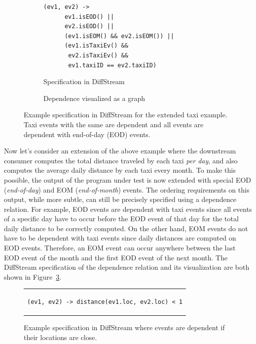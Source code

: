 \begin{figure}[t]
  \centering \footnotesize{}
  \begin{subfigure}[b]{0.56\textwidth}
    \centering
    \begin{lstlisting}[basicstyle=\ttfamily\small,linewidth=7.3cm]
  (ev1, ev2) ->
      ev1.isEOD() ||
      ev2.isEOD() ||
      (ev1.isEOM() && ev2.isEOM()) ||
      (ev1.isTaxiEv() &&
       ev2.isTaxiEv() &&
       ev1.taxiID == ev2.taxiID)
    \end{lstlisting}
    \caption{Specification in DiffStream}
    \label{diffstream:fig:extended-taxi-example-dependency-spec}
  \end{subfigure}%
  \qquad
  \begin{subfigure}[b]{0.36\textwidth}
    \centering
    \caption{Dependence visualized as a graph}
    \label{diffstream:fig:extended-taxi-example-dependency-vis}
  \end{subfigure}
  \caption{Example specification in DiffStream for the extended taxi example. Taxi events with the same  are dependent
      and all events are dependent with end-of-day (EOD) events.}
  \label{diffstream:fig:extended-example-dependencies}
\end{figure}

Now let's consider an extension of the above example where the downstream consumer
computes the total distance traveled by each taxi \emph{per
  day}, and also computes the average daily distance by each taxi
every month. To make this possible, the output of the program under test
is now
extended with special EOD (\emph{end-of-day}) and EOM (\emph{end-of-month})
events. The ordering requirements on this output, while more subtle, can still be
precisely specified using a dependence relation.
For example, EOD events are dependent with taxi events since all events of a specific day have to occur before the EOD event of that day for the total daily distance to be correctly computed. On the other hand, EOM events do not have to be dependent with taxi events since daily distances are computed on EOD events. Therefore, an EOM event can occur anywhere between the last EOD event of the month and the first EOD event of the next month.
The DiffStream specification of the dependence relation and its visualization are both shown in Figure~\ref{diffstream:fig:extended-example-dependencies}.

\begin{figure}[t]
  \centering \footnotesize{}
\begin{tabular}{c}
\begin{lstlisting}[basicstyle=\ttfamily\small,linewidth=9cm]
  (ev1, ev2) -> distance(ev1.loc, ev2.loc) < 1
\end{lstlisting}
\end{tabular}
  \caption{Example specification in DiffStream where  events are dependent if their locations are close.}
  \label{diffstream:fig:proximity-example-dependencies}
\end{figure}

